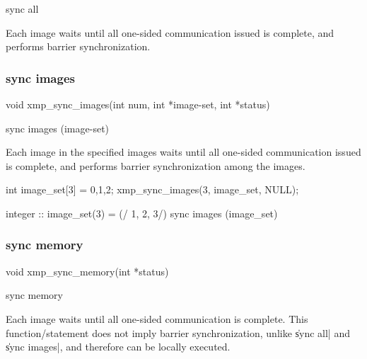 \begin{XFexample}
sync all
\end{XFexample}

Each image waits until all one-sided communication issued is complete,
and performs barrier synchronization.


\subsubsection{sync images}

\begin{XCexample}
void xmp_sync_images(int num, int *image-set, int *status)
\end{XCexample}

\begin{XFexample}
sync images (image-set)
\end{XFexample}

Each image in the specified images waits until all one-sided
communication issued is complete, and performs barrier synchronization
among the images.

\begin{XCexample}
int image_set[3] = {0,1,2};
xmp_sync_images(3, image_set, NULL);
\end{XCexample}

\begin{XFexample}
integer :: image_set(3) = (/ 1, 2, 3/)
sync images (image_set)
\end{XFexample}


\subsubsection{sync memory}

\begin{XCexample}
void xmp_sync_memory(int *status)
\end{XCexample}

\begin{XFexample}
sync memory
\end{XFexample}

Each image waits until all one-sided communication is complete. This
function/statement does not imply barrier synchronization, unlike
\|sync all| and \|sync images|, and therefore can be locally executed. 



